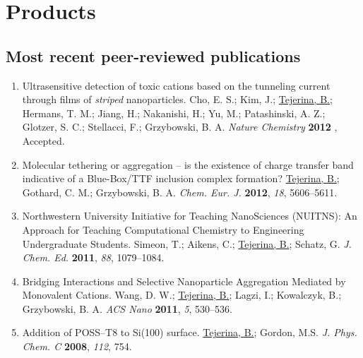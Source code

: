 \documentclass{article}
\begin{document}
\section*{Products}

\subsection*{Most recent peer-reviewed publications}

\begin{enumerate}

\item Ultrasensitive detection of toxic cations based on the tunneling current through films of \emph{striped} nanoparticles. Cho, E. S.; Kim, J.; \underline{Tejerina, B.}; Hermans, T. M.; Jiang, H.; Nakanishi, H.; Yu, M.; Patashinski, A. Z.; Glotzer, S. C.; Stellacci, F.; Grzybowski, B. A. \emph{Nature Chemistry} {\bf 2012} \emph{}, Accepted.

\item Molecular tethering or aggregation -- is the existence of charge transfer band indicative of a Blue-Box/TTF inclusion complex formation? \underline{Tejerina, B.}; Gothard, C. M.; Grzybowski, B. A. \emph{Chem. Eur. J.} {\bf 2012}, \emph{18}, 5606--5611.

\item Northwestern University Initiative for Teaching NanoSciences (NUITNS): An Approach for Teaching Computational Chemistry to Engineering Undergraduate Students. Simeon, T.; Aikens, C.; \underline{Tejerina, B.}; Schatz, G. \emph{J. Chem. Ed.} {\bf 2011}, \emph{88}, 1079--1084.

\item  Bridging Interactions and Selective Nanoparticle Aggregation Mediated by Monovalent Cations. Wang, D. W.;  \underline{Tejerina, B.}; Lagzi, I.; Kowalczyk, B.; Grzybowski, B. A. \emph{ACS Nano} {\bf 2011}, \emph{5}, 530--536.

 \item Addition of POSS--T8 to Si(100) surface.  \underline{Tejerina, B.}; Gordon, M.S. \emph{J. Phys. Chem. C} {\bf 2008}, \emph{112}, 754.
\end{enumerate}
\end{document}
